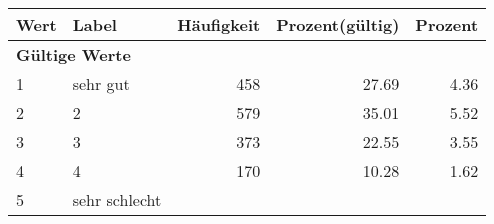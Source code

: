      \begin{longtable}{lXrrr}
     \toprule
     \textbf{Wert} & \textbf{Label} & \textbf{Häufigkeit} & \textbf{Prozent(gültig)} & \textbf{Prozent} \\
     \endhead
     \midrule
     \multicolumn{5}{l}{\textbf{Gültige Werte}}\\

     1 &
     \multicolumn{1}{X}{ sehr gut   } &


       \num{458} &
       \num[round-mode=places,round-precision=2]{27.69} &
         \num[round-mode=places,round-precision=2]{4.36} \\

     2 &
     \multicolumn{1}{X}{ 2   } &


       \num{579} &
       \num[round-mode=places,round-precision=2]{35.01} &
         \num[round-mode=places,round-precision=2]{5.52} \\

     3 &
     \multicolumn{1}{X}{ 3   } &


       \num{373} &
       \num[round-mode=places,round-precision=2]{22.55} &
         \num[round-mode=places,round-precision=2]{3.55} \\

     4 &
     \multicolumn{1}{X}{ 4   } &


       \num{170} &
       \num[round-mode=places,round-precision=2]{10.28} &
         \num[round-mode=places,round-precision=2]{1.62} \\

     5 &
     \multicolumn{1}{X}{ sehr schlecht   } &



\end{longtable}
